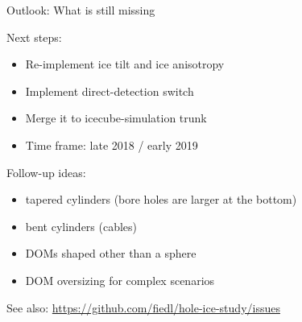 
\begin{frame}{Outlook: What is still missing}

  Next steps:

  \begin{itemize}
    \item Re-implement ice tilt and ice anisotropy
    \item Implement direct-detection switch
    \item Merge it to icecube-simulation trunk
    \item Time frame: late 2018 / early 2019
  \end{itemize}

  \bigskip

  Follow-up ideas:
  \begin{itemize}
    \item tapered cylinders (bore holes are larger at the bottom)
    \item bent cylinders (cables)
    \item DOMs shaped other than a sphere
    \item DOM oversizing for complex scenarios
  \end{itemize}


  \bigskip

  See also: \url{https://github.com/fiedl/hole-ice-study/issues}
\end{frame}
